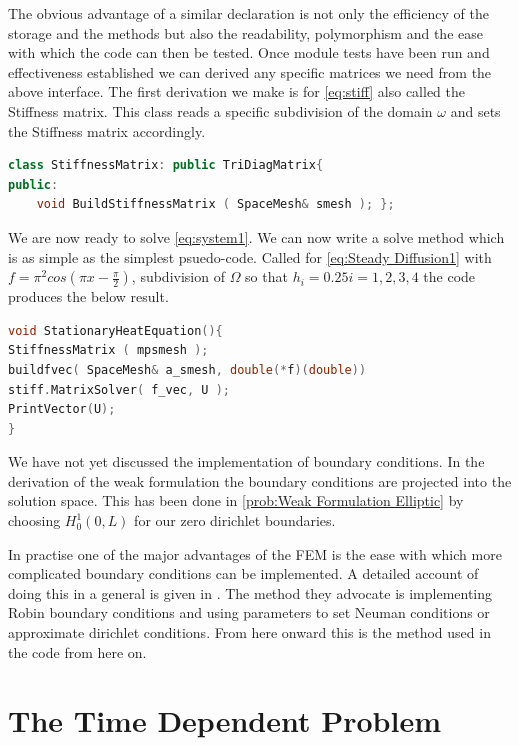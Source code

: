 \documentclass{uonmathreport}
\theoremstyle{definition}
\theoremstyle{problem}
\theoremstyle{theorem}
\begin{document}
The obvious advantage of a similar declaration is not only the efficiency of the storage and the methods but also the readability, polymorphism and the ease with which the code can then be tested. Once module tests have been run and effectiveness established we can derived any specific matrices we need from the above interface. The first derivation we make is for \ref{eq:stiff} also called the Stiffness matrix. This class reads a specific subdivision of the domain $\omega$ and sets the Stiffness matrix accordingly.

\begin{lstlisting}[language=C++]
class StiffnessMatrix: public TriDiagMatrix{
public:
    void BuildStiffnessMatrix ( SpaceMesh& smesh ); };

\end{lstlisting}

We are now ready to solve \ref{eq:system1}. We can now write a solve method which is as simple as the simplest psuedo-code. Called for \ref{eq:Steady Diffusion1} with  $f=\pi^2cos(\pi x - \frac{\pi}{2})$, subdivision of $\Omega$ so that $h_i = 0.25 i=1, 2, 3, 4$   the code produces the below result.\\

\begin{lstlisting}[language=C++]
void StationaryHeatEquation(){
StiffnessMatrix ( mpsmesh );
buildfvec( SpaceMesh& a_smesh, double(*f)(double))
stiff.MatrixSolver( f_vec, U );
PrintVector(U);
}
\end{lstlisting}

\clearpage

We have not yet discussed the implementation of boundary conditions. In the derivation of the weak formulation the boundary conditions are projected into the solution space. This has been done in \ref{prob:Weak Formulation Elliptic} by choosing $H^1_0(0, L)$ for our zero dirichlet boundaries.

In practise one of the major advantages of the FEM is the ease with which more complicated boundary conditions can be implemented. A detailed account of doing this in a general is given in \cite{larson2013finite}. The method they advocate is implementing Robin boundary conditions and using parameters to set Neuman conditions or approximate dirichlet conditions. From here onward this is the method used in the code from here on.



\section{The Time Dependent Problem} \label{sec:Time dependent}
\end{document}
